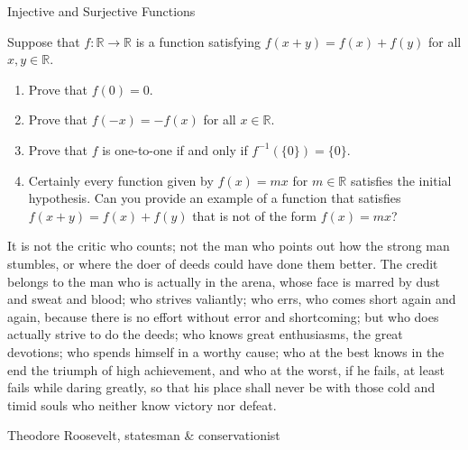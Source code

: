 \begin{section}{Injective and Surjective Functions}
\begin{problem}
Suppose that $f: \mathbb{R}\to \mathbb{R}$ is a function satisfying $f(x+y)=f(x)+f(y)$ for all $x,y\in\mathbb{R}$.
\begin{enumerate}
\item Prove that $f(0)=0$.
\item Prove that $f(-x)=-f(x)$ for all $x\in\mathbb{R}$.
\item Prove that $f$ is one-to-one if and only if $f^{-1}(\{0\})=\{0\}$.
\item Certainly every function given by $f(x)=mx$ for $m\in\mathbb{R}$ satisfies the initial hypothesis. Can you provide an example of a function that satisfies $f(x+y)=f(x)+f(y)$ that is not of the form $f(x)=mx$?
\end{enumerate}
\end{problem}

\begingroup
\setlength{\epigraphwidth}{0.8\textwidth}
\epigraph{It is not the critic who counts; not the man who points out how the strong man stumbles, or where the doer of deeds could have done them better. The credit belongs to the man who is actually in the arena, whose face is marred by dust and sweat and blood; who strives valiantly; who errs, who comes short again and again, because there is no effort without error and shortcoming; but who does actually strive to do the deeds; who knows great enthusiasms, the great devotions; who spends himself in a worthy cause; who at the best knows in the end the triumph of high achievement, and who at the worst, if he fails, at least fails while daring greatly, so that his place shall never be with those cold and timid souls who neither know victory nor defeat.}{Theodore Roosevelt, statesman \& conservationist}
\endgroup

\end{section}